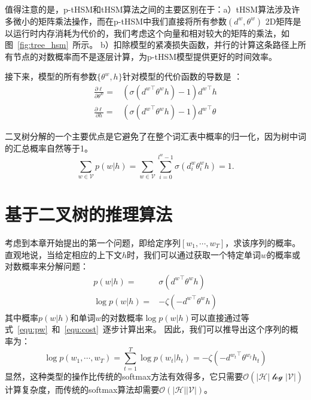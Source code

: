 值得注意的是，p-tHSM和tHSM算法之间的主要区别在于：a）tHSM算法涉及许多微小的矩阵乘法操作，而在p-tHSM中我们直接将所有参数$(d^w,\theta^w)$ 2D矩阵是以运行时内存消耗为代价的，我们考虑这个向量和相对较大的矩阵的乘法，如图~\ref{fig:tree_hsm}~所示。 b）扣除模型的紧凑损失函数，并行的计算这条路径上所有节点的对数概率而不是逐层计算，为p-tHSM模型提供更好的时间效率。

接下来，模型的所有参数$\{\theta^w,h\}$针对模型的代价函数的导数是 ：
\begin{equation}
\begin{split}
\frac{\partial \ell}{\partial \theta^w}=&(\sigma({d^w}^\top\theta^w h) -1){d^w}^\top h \\
\frac{\partial \ell}{\partial h}=&(\sigma({d^w}^\top \theta^w h) -1){d^w}^\top \theta
\end{split}
\end{equation}


二叉树分解的一个主要优点是它避免了在整个词汇表中概率的归一化，因为树中词的汇总概率自然等于1。
\begin{equation}
\sum_{w\in \mathcal{V}}{p(w|h)}=\sum_{w \in \mathcal{V}}\sum_{i=0}^{l^w-1}{\sigma(d_i^w\theta_{i}^w h)}=1.
\end{equation}





\section{基于二叉树的推理算法}
考虑到本章开始提出的第一个问题，即给定序列$ [w_1,\cdots,w_T] $，求该序列的概率。 直观地说，当给定相应的上下文$ h $时，我们可以通过获取一个特定单词$ w $的概率或对数概率来分解问题：
\begin{equation}
\begin{split}
    p(w|h) =&\sigma({d^w}^\top \theta^w h)\\
   \log p(w|h) =& -\zeta(- {d^{w}}^\top \theta^{w} h )
\end{split}
\end{equation}
其中概率$ p(w | h)$和单词$ w $的对数概率$ \log p(w | h)$可以直接通过等式~\ref{equ:pw}~和~\ref{equ:cost}~逐步计算出来。 因此，我们可以推导出这个序列的概率为：
\begin{equation}
   \log p(w_1,\cdots, w_T)=\sum_{t=1}^T\log p(w_t|h_t) = -\zeta(- {d^{w_t}}^\top \theta^{w_t} h_t )
\end{equation}
显然，这种类型的操作比传统的softmax方法有效得多，它只需要$\mathcal{O}(\mathcal {| H | \log| V |})$计算复杂度，而传统的softmax算法却需要$\mathcal{O}(\mathcal {| H || V |})$。

